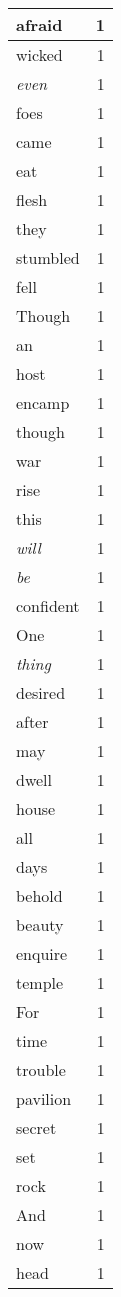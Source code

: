 \begin{center}
\begin{longtable}{l|r}
afraid & 1 \\ \hline
wicked & 1 \\ \hline
\emph{even} & 1 \\ \hline
foes & 1 \\ \hline
came & 1 \\ \hline
eat & 1 \\ \hline
flesh & 1 \\ \hline
they & 1 \\ \hline
stumbled & 1 \\ \hline
fell & 1 \\ \hline
Though & 1 \\ \hline
an & 1 \\ \hline
host & 1 \\ \hline
encamp & 1 \\ \hline
though & 1 \\ \hline
war & 1 \\ \hline
rise & 1 \\ \hline
this & 1 \\ \hline
\emph{will} & 1 \\ \hline
\emph{be} & 1 \\ \hline
confident & 1 \\ \hline
One & 1 \\ \hline
\emph{thing} & 1 \\ \hline
desired & 1 \\ \hline
after & 1 \\ \hline
may & 1 \\ \hline
dwell & 1 \\ \hline
house & 1 \\ \hline
all & 1 \\ \hline
days & 1 \\ \hline
behold & 1 \\ \hline
beauty & 1 \\ \hline
enquire & 1 \\ \hline
temple & 1 \\ \hline
For & 1 \\ \hline
time & 1 \\ \hline
trouble & 1 \\ \hline
pavilion & 1 \\ \hline
secret & 1 \\ \hline
set & 1 \\ \hline
rock & 1 \\ \hline
And & 1 \\ \hline
now & 1 \\ \hline
head & 1 \\ \hline

\end{longtable}
\end{center}
